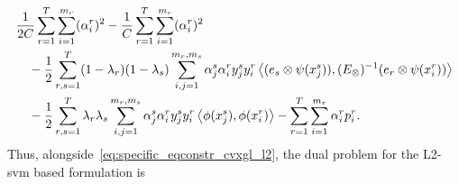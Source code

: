 \begin{equation}
    \nonumber
    \begin{aligned}
         & \frac{1}{2C} \sum_{r=1}^T \sum_{i=1}^{m_r} (\alpha_i^r)^2 - \frac{1}{C} \sum_{r=1}^T \sum_{i=1}^{m_r} (\alpha_i^r)^2                                                                             \\
         & \quad - \frac{1}{2} \sum_{r, s=1}^T (1-\lambda_r)(1-\lambda_s) \sum_{i, j=1}^{m_r, m_s} \alpha_j^s \alpha_i^r y_j^s y_i^r \bm{\left\langle} (e_s \otimes \psi(x_j^s)), (E_\otimes)^{-1} (e_r \otimes \psi(x_i^r)) \bm{\right\rangle}             \\
         & \quad - \frac{1}{2} \sum_{r,s=1}^T \lambda_r \lambda_s \sum_{i, j=1}^{m_r, m_s} \alpha_j^s \alpha_i^r y_j^s y_i^r \bm{\left\langle} \phi(x_j^s), \phi(x_i^r) \bm{\right\rangle} - \sum_{r=1}^T \sum_{i=1}^{m_r} \alpha_i^r p_i^r . \\
    \end{aligned}
\end{equation}
Thus, alongside~\eqref{eq:specific_eqconstr_cvxgl_l2}, the dual problem for the L2-\acrshort{svm} based formulation is
